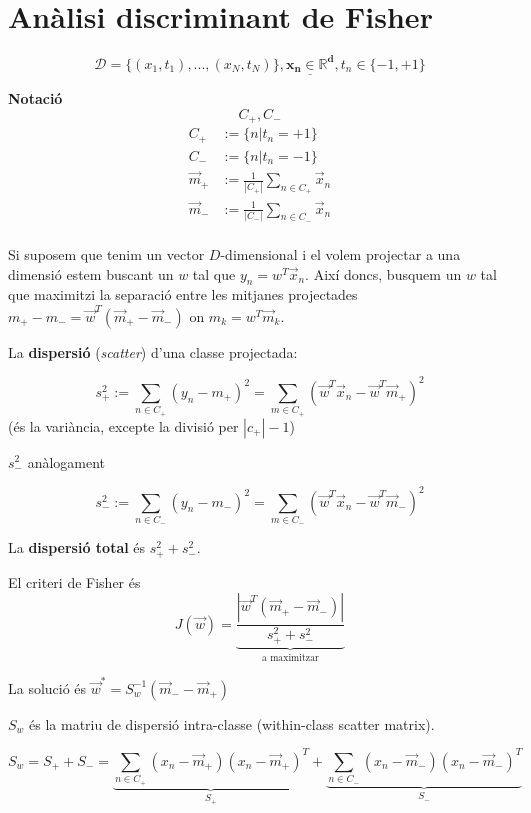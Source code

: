 \documentclass[a4paper]{article}
\begin{document}
	\section{Anàlisi discriminant de Fisher}
	$$  \mathcal{D} = \{(x_1, t_1), ..., (x_N, t_N)\}, \underline{\boldsymbol{x_n \in \mathbb{R}^d}}, t_n \in \{-1, +1 \}  $$
	
	
	\textbf{Notació}
	$$  C_+, C_-  $$
	\begin{align*}
		C_+ &:= \{ n | t_n = +1 \} \\
		C_- &:= \{ n | t_n = -1 \} \\
		\vec{m}_+ &:= \frac{1}{|C_+|} \sum_{n\in C_+} \vec{x}_n \\
		\vec{m}_- &:= \frac{1}{|C_-|} \sum_{n\in C_-} \vec{x}_n \\
	\end{align*}
	
	Si suposem que tenim un vector $D$-dimensional i el volem projectar a una dimensió estem buscant un $w$ tal que $y_n = w^T \vec{x}_n$. Així doncs, busquem un $w$ tal que maximitzi la separació entre les mitjanes projectades $m_+ - m_- = \vec{w}^T(\vec{m}_+ - \vec{m}_-)$ on $m_k = w^T \vec{m}_k$.
	
	La \textbf{dispersió} (\emph{scatter}) d'una classe projectada:
	
	$$  
	s_+^2 := \sum_{n \in C_+} (y_n - m_+)^2 = 
	\sum_{m \in C_+} (\vec{w}^T \vec{x}_n - \vec{w}^T \vec{m}_+)^2
	$$
	(és la variància, excepte la divisió per $|c_+| - 1$)

	$s_-^2$ anàlogament 
	
	$$
	s_-^2 := \sum_{n \in C_-} (y_n - m_-)^2 = 
	\sum_{m \in C_-} (\vec{w}^T \vec{x}_n - \vec{w}^T \vec{m}_-)^2
	$$
	
	La \textbf{dispersió total} és $s_+^2 + s_-^2$.
	
	El criteri de Fisher és $$  J(\vec{w}) = \underbrace{\frac{|\vec{w}^T(\vec{m}_+-\vec{m}_-)|}{s_+^2 + s_-^2}}_\text{a maximitzar}  $$
	
	La solució és $\vec{w}^* = S_w^{-1}(\vec{m}_- - \vec{m}_+)$
	
	$S_w$ és la matriu de dispersió intra-classe (within-class scatter matrix).
	
	$$
	S_w = S_+ + S_- = 
	\underbrace{\sum_{n \in C_+} (x_n - \vec{m}_+)(x_n - \vec{m}_+)^T}_{S_+} +
	\underbrace{\sum_{n \in C_-} (x_n - \vec{m}_-)(x_n - \vec{m}_-)^T}_{S_-}  
	$$
	
\end{document}
